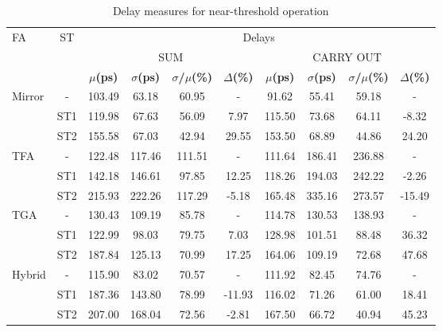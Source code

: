 \documentclass[pgmicro,mestrado,english]{iiufrgs}
\begin{document}
\begin{table}[]
\centering
\caption{Delay measures for near-threshold operation}
\label{delayNT}
\begin{tabular}{lccccccccc}
\hline
\multirow{3}{*}{FA} & \multirow{3}{*}{ST} & \multicolumn{8}{c}{Delays} \\ \cline{3-10} 
& & \multicolumn{4}{c}{SUM} & \multicolumn{4}{c}{CARRY OUT} \\ \cline{3-10}  
& & \textbf{$\mu$(ps)} & \textbf{$\sigma$(ps)} & \textbf{$\sigma$/$\mu$(\%)} & \textbf{$\Delta$(\%)} & \textbf{$\mu$(ps)} & \textbf{$\sigma$(ps)} & \textbf{$\sigma$/$\mu$(\%)} & \textbf{$\Delta$(\%)} \\ \hline
\multirow{3}{*}{Mirror} & - & 103.49 & 63.18 & 60.95 & - & 91.62 & 55.41 & 59.18 & - \\ \cline{2-10}
& ST1 & 119.98 & 67.63 & 56.09 & 7.97 & 115.50 & 73.68 & 64.11 & -8.32 \\ \cline{2-10}
& ST2 & 155.58 & 67.03 & 42.94 & 29.55 & 153.50 & 68.89 & 44.86 & 24.20 \\ \hline
\multirow{3}{*}{TFA} & - & 122.48 & 117.46 & 111.51 & - & 111.64 & 186.41 & 236.88 & - \\ \cline{2-10}
& ST1 & 142.18 & 146.61 & 97.85 & 12.25 & 118.26 & 194.03 & 242.22 & -2.26 \\ \cline{2-10}
& ST2 & 215.93 & 222.26 & 117.29 & -5.18 & 165.48 & 335.16 & 273.57 & -15.49 \\ \hline
\multirow{3}{*}{TGA} & - & 130.43 & 109.19 & 85.78 & - & 114.78 & 130.53 & 138.93 & - \\ \cline{2-10}
& ST1 & 122.99 & 98.03 & 79.75 & 7.03 & 128.98 & 101.51 & 88.48 & 36.32 \\ \cline{2-10}
& ST2 & 187.84 & 125.13 & 70.99 & 17.25 & 164.06 & 109.19 & 72.68 & 47.68 \\ \hline
\multirow{3}{*}{Hybrid} & - & 115.90 & 83.02 & 70.57 & - & 111.92 & 82.45 & 74.76 & - \\ \cline{2-10}
& ST1 & 187.36 & 143.80 & 78.99 & -11.93 & 116.02 & 71.26 & 61.00 & 18.41 \\ \cline{2-10}
& ST2 & 207.00 & 168.04 & 72.56 & -2.81 & 167.50 & 66.72 & 40.94 & 45.23 \\ \hline
\end{tabular}
\end{table}
\vspace{1em}
\end{document}
